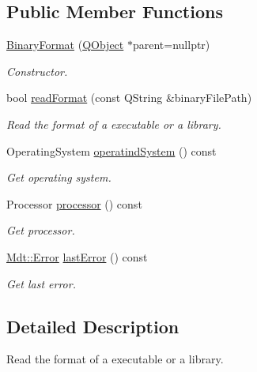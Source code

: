\subsection*{Public Member Functions}
\begin{DoxyCompactItemize}
\item 
\hyperlink{class_mdt_1_1_deploy_utils_1_1_binary_format_afc8824fd9d24d38d37dc11d9845d6d6c}{Binary\+Format} (\hyperlink{class_q_object}{Q\+Object} $\ast$parent=nullptr)
\begin{DoxyCompactList}\small\item\em Constructor. \end{DoxyCompactList}\item 
bool \hyperlink{class_mdt_1_1_deploy_utils_1_1_binary_format_a9a0d738562a41af21b81d12199b62ea4}{read\+Format} (const Q\+String \&binary\+File\+Path)
\begin{DoxyCompactList}\small\item\em Read the format of a executable or a library. \end{DoxyCompactList}\item 
Operating\+System \hyperlink{class_mdt_1_1_deploy_utils_1_1_binary_format_ae2dacfb9fcbca3950f42db853d38ed28}{operatind\+System} () const 
\begin{DoxyCompactList}\small\item\em Get operating system. \end{DoxyCompactList}\item 
Processor \hyperlink{class_mdt_1_1_deploy_utils_1_1_binary_format_a6ef69355fc5185e203e2952ebeafc62e}{processor} () const 
\begin{DoxyCompactList}\small\item\em Get processor. \end{DoxyCompactList}\item 
\hyperlink{class_mdt_1_1_error}{Mdt\+::\+Error} \hyperlink{class_mdt_1_1_deploy_utils_1_1_binary_format_a66bc1c286aa55a5634fcb89669d53496}{last\+Error} () const 
\begin{DoxyCompactList}\small\item\em Get last error. \end{DoxyCompactList}\end{DoxyCompactItemize}


\subsection{Detailed Description}
Read the format of a executable or a library. 

